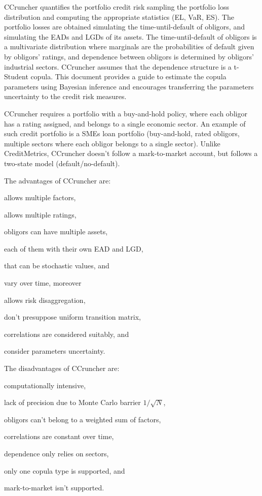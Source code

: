 \documentclass[11pt,fleqn]{book} %
\begin{document}
CCruncher quantifies the portfolio credit risk sampling the portfolio loss
distribution and computing the appropriate statistics (EL, VaR, ES). The 
portfolio losses are obtained simulating the time-until-default of obligors, 
and simulating the EADs and LGDs of its assets. The time-until-default of 
obligors is a multivariate distribution where marginals are the probabilities 
of default given by obligors' ratings, and dependence between obligors is 
determined by obligors' industrial sectors.
CCruncher assumes that the dependence structure is a t-Student copula.
This document provides a guide to estimate the copula parameters using
Bayesian inference and encourages transferring the parameters uncertainty
to the credit risk measures.

CCruncher requires a portfolio with a buy-and-hold policy, where each obligor 
has a rating assigned, and belongs to a single economic sector.
An example of such credit portfolio is a SMEs loan portfolio (buy-and-hold, 
rated obligors, multiple sectors where each obligor belongs to a single sector). 
Unlike CreditMetrics\texttrademark{}, CCruncher doesn't follow a mark-to-market 
account, but follows a two-state model (default/no-default). 

The advantages of CCruncher are: 
\begin{inparaenum}[1)]
	\item allows multiple factors,
	\item allows multiple ratings,
	\item obligors can have multiple assets,
	\item each of them with their own EAD and LGD,
	\item that can be stochastic values, and
	\item vary over time, moreover
	\item allows risk disaggregation,
	\item don't presuppose uniform transition matrix,
	\item correlations are considered suitably, and
	\item consider parameters uncertainty.
\end{inparaenum}

The disadvantages of CCruncher are: 
\begin{inparaenum}[1)]
	\item computationally intensive,
	\item lack of precision due to Monte Carlo barrier $1/\sqrt{N}$,
	\item obligors can't belong to a weighted sum of factors,
	\item correlations are constant over time,
	\item dependence only relies on sectors,
	\item only one copula type is supported, and
	\item mark-to-market isn't supported.
\end{inparaenum}
\end{document}
